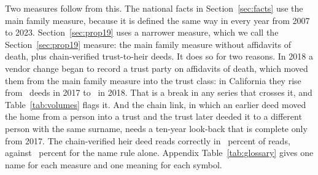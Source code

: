 Two measures follow from this. The national facts in Section~\ref{sec:facts} use the main family measure, because it is defined the same way in every year from 2007 to 2023. Section~\ref{sec:prop19} uses a narrower measure, which we call the Section~\ref{sec:prop19} measure: the main family measure without affidavits of death, plus chain-verified trust-to-heir deeds. It does so for two reasons. In 2018 a vendor change began to record a trust party on affidavits of death, which moved them from the main family measure into the trust class: in California they rise from \SIIIAfTrustCATwentySeventeen\ deeds in 2017 to \SIIIAfTrustCATwentyEighteen\ in 2018. That is a break in any series that crosses it, and Table~\ref{tab:volumes} flags it. And the chain link, in which an earlier deed moved the home from a person into a trust and the trust later deeded it to a different person with the same surname, needs a ten-year look-back that is complete only from 2017. The chain-verified heir deed reads correctly in \SIIIReadHeir\ percent of reads, against \SIIIReadToOther\ percent for the name rule alone. Appendix Table~\ref{tab:glossary} gives one name for each measure and one meaning for each symbol.

